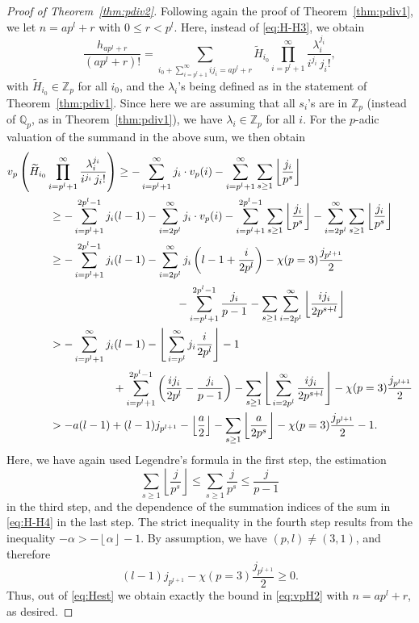 \documentclass[12pt,reqno]{amsart}
\numberwithin{equation}{section}
\theoremstyle{remark}
\begin{document}
\begin{proof}[Proof of Theorem~{\em \ref{thm:pdiv2}}]
Following again the proof of Theorem~\ref{thm:pdiv1},
we let $n=ap^l+r$ with $0\le r<p^l$.
Here, instead of \eqref{eq:H-H3}, we obtain
\begin{equation} \label{eq:H-H4} 
\frac {h_{ap^l+r}} {(ap^l+r)!}=
\sum_{i_0+\sum_{i=p^l+1}^\infty ij_i=ap^l+r}
\widetilde H_{i_0}
\prod _{i=p^l+1} ^{\infty}
\frac {{\lambda}_i^{j_i}}
{i^{j_i}\,j_i!},
\end{equation}
with $\widetilde H_{i_0}\in {\mathbb{Z}}_p$ for all $i_0$, and the ${\lambda}_i$'s
being defined as in the statement of Theorem~\ref{thm:pdiv1}. Since
here we are assuming that all $s_i$'s are in ${\mathbb{Z}}_p$ (instead of
${\mathbb{Q}}_p$, as in Theorem~\ref{thm:pdiv1}), we have ${\lambda}_i\in {\mathbb{Z}}_p$
for all $i$. For the $p$-adic valuation of the summand in the above
sum, we then obtain
{\allowdisplaybreaks
\begin{align}
\notag
v_p&\left(\widetilde H_{i_0}
\prod _{i=p^l+1} ^{\infty}
\frac {{\lambda}_i^{j_i}}
{i^{j_i}\,j_i!}\right)
\ge -\sum_{i=p^l+1}^\infty j_i\cdot v_p(i)
-\sum_{i=p^l+1}^\infty\sum_{s\ge1}{\left\lfloor{\frac {j_i} {p^s}}\right\rfloor}\\
\notag
&\kern1cm
\ge
-\sum_{i=p^l+1}^{2p^l-1} j_i(l-1)
-\sum_{i=2p^l}^\infty j_i\cdot v_p(i)
-\sum_{i=p^l+1}^{2p^l-1}\sum_{s\ge1}{\left\lfloor{\frac {j_i} {p^s}}\right\rfloor}
-\sum_{i=2p^l}^\infty\sum_{s\ge1}{\left\lfloor{\frac {j_i} {p^s}}\right\rfloor}\\
\notag
&\kern1cm
\ge
-\sum_{i=p^l+1}^{2p^l-1} j_i(l-1)
-\sum_{i=2p^l}^\infty j_i\left(l-1+\frac {i} {2p^l}\right)
-\chi(p=3)\frac {j_{p^{l+1}}}2 \\
\notag
&\kern5cm
-\sum_{i=p^l+1}^{2p^l-1}\frac {j_i} {p-1}
-\sum_{s\ge1}\sum_{i=2p^l}^\infty{\left\lfloor{\frac {ij_i} {2p^{s+l}}}\right\rfloor}\\
\notag
&\kern1cm
>
-\sum_{i=p^l+1}^\infty j_i(l-1)
-\Bigg\lfloor\sum_{i=p^l}^\infty j_i\frac {i} {2p^l}\Bigg\rfloor-1\\
\notag
&\kern3cm
+\sum_{i=p^l+1}^{2p^l-1}\left(\frac {ij_i} {2p^l}
-\frac {j_i} {p-1}\right)
-\sum_{s\ge1}\Bigg\lfloor\sum_{i=2p^l}^\infty\frac {ij_i}
{2p^{s+l}}\Bigg\rfloor
-\chi(p=3)\frac {j_{p^{l+1}}}2\\
&\kern1cm
>
-a(l-1)+(l-1)j_{p^{l+1}}
-{\left\lfloor{\frac {a} {2}}\right\rfloor}
-\sum_{s\ge1}{\left\lfloor{\frac {a} {2p^{s}}}\right\rfloor}-\chi(p=3)\frac {j_{p^{l+1}}}2
-1.
\label{eq:Hest}
\end{align}}Here, we have again used Legendre's formula \cite[p.~10]{LegeAA} in
the first step, the estimation
$$
\sum_{s\ge1}{\left\lfloor{\frac {j} {p^s}}\right\rfloor}\le 
\sum_{s\ge1}\frac {j} {p^s}\le \frac {j} {p-1}
$$
in the third step, and the dependence of the summation indices of the sum
in \eqref{eq:H-H4} in the last step. The strict inequality in the 
fourth step results from the inequality $-{\alpha}>-{\left\lfloor{\alpha}\right\rfloor}-1$. 
By assumption, we have $(p,l)\ne (3,1)$, and therefore
$$
(l-1)j_{p^{l+1}}-\chi(p=3)\frac {j_{p^{l+1}}}2\ge0.$$
Thus, out of \eqref{eq:Hest} we obtain exactly the bound in
\eqref{eq:vpH2} with $n=ap^l+r$, as desired.
\end{proof}
\end{document}
